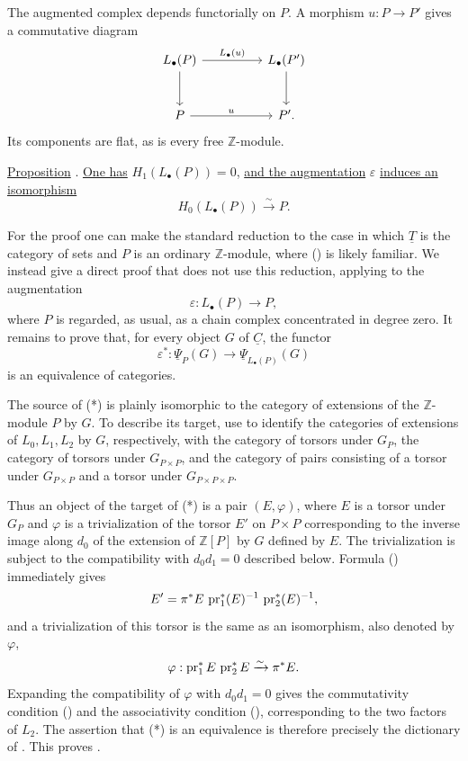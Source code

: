 The augmented complex depends functorially on $P$.  A morphism
$u:P\longrightarrow P'$ gives a commutative diagram
\[
\begin{tikzcd}[column sep=huge,row sep=large]
 L_\bullet(P)\arrow[r,"L_\bullet(u)"]\arrow[d]
 &L_\bullet(P')\arrow[d]\\
 P\arrow[r,"u"]&P'.
\end{tikzcd}
\]
Its components are flat, as is every free $\mathbb Z$-module.

\underline{Proposition} . \underline{One has}
$H_1(L_\bullet(P))=0$, \underline{and the augmentation}
$\varepsilon$ \underline{induces an isomorphism}
\[
 H_0(L_\bullet(P))\xrightarrow{\sim}P.
\]

For the proof one can make the standard reduction to the case in
which $\underline T$ is the category of sets and $P$ is an ordinary
$\mathbb Z$-module, where () is likely familiar.  We instead
give a direct proof that does not use this reduction, applying 
to the augmentation
\[
 \varepsilon:L_\bullet(P)\longrightarrow P,
\]
where $P$ is regarded, as usual, as a chain complex concentrated in
degree zero.  It remains to prove that, for every object $G$ of
$\underline C$, the functor
\begin{equation}\tag{*}
 \varepsilon^*:\underline\Psi_P(G)\longrightarrow
 \underline\Psi_{L_\bullet(P)}(G)
\end{equation}
is an equivalence of categories.

The source of (*) is plainly isomorphic to the category of
extensions of the $\mathbb Z$-module $P$ by $G$.  To describe its
target, use  to identify the categories of extensions of
$L_0,L_1,L_2$ by $G$, respectively, with the category of torsors
under $G_P$, the category of torsors under $G_{P\times P}$, and the
category of pairs consisting of a torsor under $G_{P\times P}$ and
a torsor under $G_{P\times P\times P}$.

Thus an object of the target of (*) is a pair $(E,\varphi)$, where
$E$ is a torsor under $G_P$ and $\varphi$ is a trivialization of the
torsor $E'$ on $P\times P$ corresponding to the inverse image along
$d_0$ of the extension of $\mathbb Z[P]$ by $G$ defined by $E$.
The trivialization is subject to the compatibility with
$d_0d_1=0$ described below.  Formula () immediately gives
\[
 E'=\pi^*E\,\operatorname{pr}_1^*(E)^{-1}\,\operatorname{pr}_2^*(E)^{-1},
\]
and a trivialization of this torsor is the same as an isomorphism,
also denoted by $\varphi$,
\[
 \varphi:\operatorname{pr}_1^*E\,\operatorname{pr}_2^*E\xrightarrow{\sim}\pi^*E.
\]
Expanding the compatibility of $\varphi$ with $d_0d_1=0$ gives the
commutativity condition () and the associativity condition
(), corresponding to the two factors of $L_2$.  The assertion
that (*) is an equivalence is therefore precisely the dictionary of
.  This proves .

